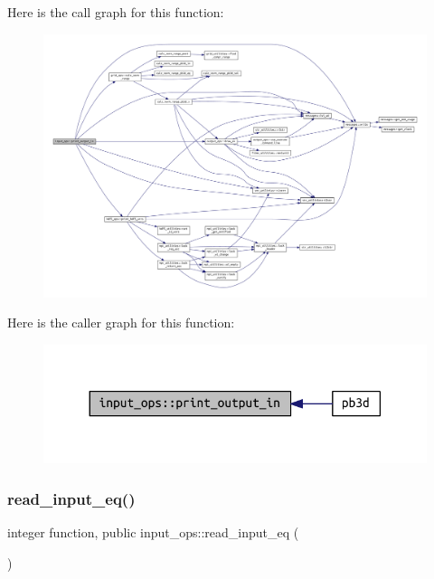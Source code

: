 Here is the call graph for this function\+:\nopagebreak
\begin{figure}[H]
\begin{center}
\leavevmode
\includegraphics[width=350pt]{namespaceinput__ops_a84ec7b3833da80ebb36ae0d5ff1a9e0a_cgraph}
\end{center}
\end{figure}
Here is the caller graph for this function\+:\nopagebreak
\begin{figure}[H]
\begin{center}
\leavevmode
\includegraphics[width=330pt]{namespaceinput__ops_a84ec7b3833da80ebb36ae0d5ff1a9e0a_icgraph}
\end{center}
\end{figure}
\mbox{\label{namespaceinput__ops_a577c897cc266961eb40bb5ef747fa077}} 
\subsubsection{\texorpdfstring{read\+\_\+input\+\_\+eq()}{read\_input\_eq()}}
{\footnotesize\ttfamily integer function, public input\+\_\+ops\+::read\+\_\+input\+\_\+eq (\begin{DoxyParamCaption}{ }\end{DoxyParamCaption})}



